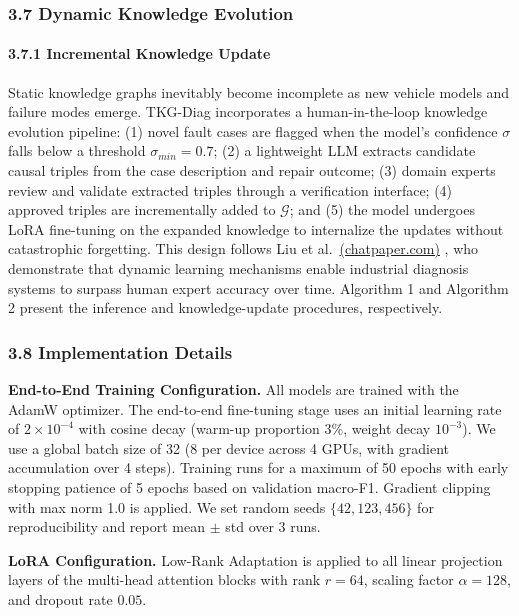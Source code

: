 \documentclass[
  11pt,
]{article}
\begin{document}
\subsubsection{3.7 Dynamic Knowledge
Evolution}\label{dynamic-knowledge-evolution}

\paragraph{3.7.1 Incremental Knowledge
Update}\label{incremental-knowledge-update}

Static knowledge graphs inevitably become incomplete as new vehicle
models and failure modes emerge. TKG-Diag incorporates a
human-in-the-loop knowledge evolution pipeline: (1) novel fault cases
are flagged when the model's confidence \(\sigma\) falls below a
threshold \(\sigma_{min} = 0.7\); (2) a lightweight LLM extracts
candidate causal triples from the case description and repair outcome;
(3) domain experts review and validate extracted triples through a
verification interface; (4) approved triples are incrementally added to
\(\mathcal{G}\); and (5) the model undergoes LoRA fine-tuning on the
expanded knowledge to internalize the updates without catastrophic
forgetting. This design follows Liu et
al.~\href{https://chatpaper.com/chatpaper/zh-CN/paper/140970}{(chatpaper.com)}
, who demonstrate that dynamic learning mechanisms enable industrial
diagnosis systems to surpass human expert accuracy over time. Algorithm
1 and Algorithm 2 present the inference and knowledge-update procedures,
respectively.

\subsubsection{3.8 Implementation Details}\label{implementation-details}

\textbf{End-to-End Training Configuration.} All models are trained with
the AdamW optimizer. The end-to-end fine-tuning stage uses an initial
learning rate of \(2 \times 10^{-4}\) with cosine decay (warm-up
proportion 3\%, weight decay \(10^{-3}\)). We use a global batch size of
32 (8 per device across 4 GPUs, with gradient accumulation over 4
steps). Training runs for a maximum of 50 epochs with early stopping
patience of 5 epochs based on validation macro-F1. Gradient clipping
with max norm 1.0 is applied. We set random seeds \(\{42, 123, 456\}\)
for reproducibility and report mean \(\pm\) std over 3 runs.

\textbf{LoRA Configuration.} Low-Rank Adaptation is applied to all
linear projection layers of the multi-head attention blocks with rank
\(r = 64\), scaling factor \(\alpha = 128\), and dropout rate \(0.05\).
\end{document}
